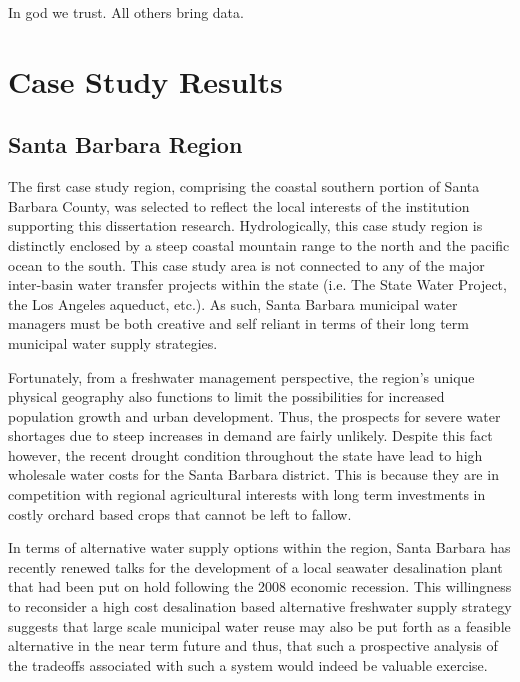 \begin{savequote}[75mm]
In god we trust. 
All others bring data. 
\end{savequote}

\chapter{Case Study Results}
\label{Chapter 4}

\newpage

\section{Santa Barbara Region}

The first case study region, comprising the coastal southern portion of Santa Barbara County, was selected to reflect the local interests of the institution supporting this dissertation research. Hydrologically, this case study region is distinctly enclosed by a steep coastal mountain range to the north and the pacific ocean to the south. This case study area is not connected to any of the major inter-basin water transfer projects within the state (i.e. The State Water Project, the Los Angeles aqueduct, etc.). As such, Santa Barbara municipal water managers must be both creative and self reliant in terms of their long term municipal water supply strategies. 

Fortunately, from a freshwater management perspective, the region's unique physical geography also functions to limit the possibilities for increased population growth and urban development. Thus, the prospects for severe water shortages due to steep increases in demand are fairly unlikely. Despite this fact however, the recent drought condition throughout the state have lead to high wholesale water costs for the Santa Barbara district. This is because they are in competition with regional agricultural interests with long term investments in costly orchard based crops that cannot be left to fallow. 

In terms of alternative water supply options within the region, Santa Barbara has recently renewed talks for the development of a local seawater desalination plant that had been put on hold following the 2008 economic recession. This willingness to reconsider a high cost desalination based alternative freshwater supply strategy suggests that large scale municipal water reuse may also be put forth as a feasible alternative in the near term future and thus, that such a prospective analysis of the tradeoffs associated with such a system would indeed be valuable exercise.  

